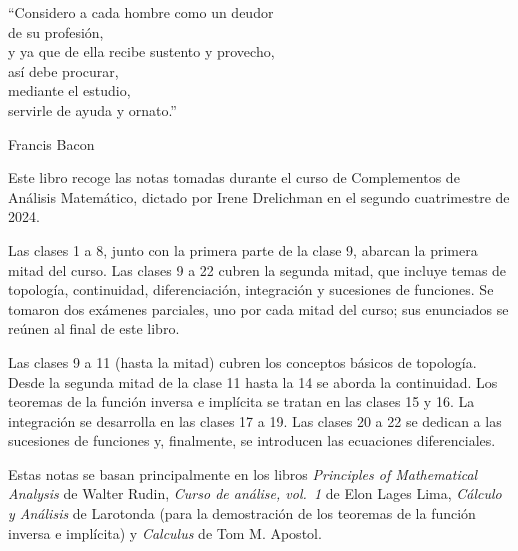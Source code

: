 \epigraph{``Considero a cada hombre como un deudor \\ de su profesión, \\ y ya que de ella recibe sustento y provecho, \\ así debe procurar, \\ mediante el estudio, \\ servirle de ayuda y ornato.''}{Francis Bacon}

Este libro recoge las notas tomadas durante el curso de Complementos de Análisis Matemático, dictado por Irene Drelichman en el segundo cuatrimestre de 2024.

Las clases 1 a 8, junto con la primera parte de la clase 9, abarcan la primera mitad del curso. Las clases 9 a 22 cubren la segunda mitad, que incluye temas de topología, continuidad, diferenciación, integración y sucesiones de funciones. Se tomaron dos exámenes parciales, uno por cada mitad del curso; sus enunciados se reúnen al final de este libro.

Las clases 9 a 11 (hasta la mitad) cubren los conceptos básicos de topología. Desde la segunda mitad de la clase 11 hasta la 14 se aborda la continuidad. Los teoremas de la función inversa e implícita se tratan en las clases 15 y 16. La integración se desarrolla en las clases 17 a 19. Las clases 20 a 22 se dedican a las sucesiones de funciones y, finalmente, se introducen las ecuaciones diferenciales.

Estas notas se basan principalmente en los libros \textit{Principles of Mathematical Analysis} de Walter Rudin, \textit{Curso de análise, vol.~1} de Elon Lages Lima, \textit{Cálculo y Análisis} de Larotonda (para la demostración de los teoremas de la función inversa e implícita) y \textit{Calculus} de Tom M. Apostol.
